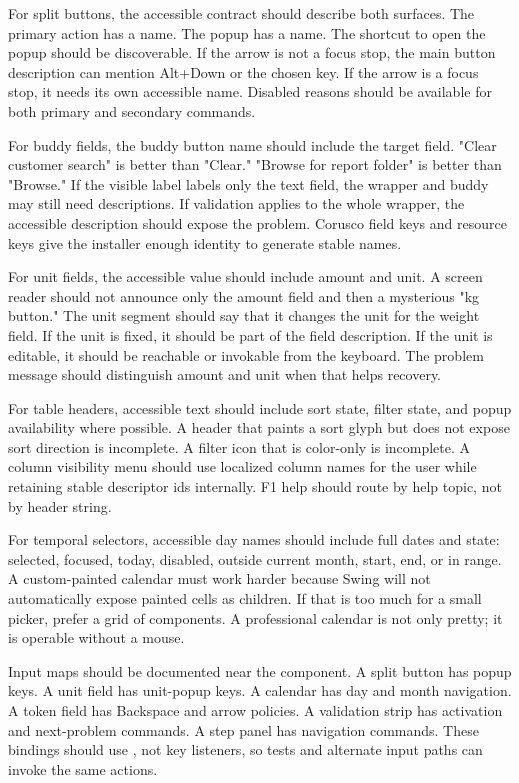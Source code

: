 For split buttons, the accessible contract should describe both surfaces. The
primary action has a name. The popup has a name. The shortcut to open the
popup should be discoverable. If the arrow is not a focus stop, the main
button description can mention Alt+Down or the chosen key. If the arrow is a
focus stop, it needs its own accessible name. Disabled reasons should be
available for both primary and secondary commands.

For buddy fields, the buddy button name should include the target field. "Clear
customer search" is better than "Clear." "Browse for report folder" is better
than "Browse." If the visible label labels only the text field, the wrapper
and buddy may still need descriptions. If validation applies to the whole
wrapper, the accessible description should expose the problem. Corusco field
keys and resource keys give the installer enough identity to generate stable
names.

For unit fields, the accessible value should include amount and unit. A screen
reader should not announce only the amount field and then a mysterious "kg
button." The unit segment should say that it changes the unit for the weight
field. If the unit is fixed, it should be part of the field description. If
the unit is editable, it should be reachable or invokable from the keyboard.
The problem message should distinguish amount and unit when that helps
recovery.

For table headers, accessible text should include sort state, filter state,
and popup availability where possible. A header that paints a sort glyph but
does not expose sort direction is incomplete. A filter icon that is color-only
is incomplete. A column visibility menu should use localized column names for
the user while retaining stable descriptor ids internally. F1 help should
route by help topic, not by header string.

For temporal selectors, accessible day names should include full dates and
state: selected, focused, today, disabled, outside current month, start, end,
or in range. A custom-painted calendar must work harder because Swing will
not automatically expose painted cells as children. If that is too much for a
small picker, prefer a grid of components. A professional calendar is not only
pretty; it is operable without a mouse.

Input maps should be documented near the component. A split button has popup
keys. A unit field has unit-popup keys. A calendar has day and month
navigation. A token field has Backspace and arrow policies. A validation strip
has activation and next-problem commands. A step panel has navigation
commands. These bindings should use , not key listeners, so
tests and alternate input paths can invoke the same actions.

